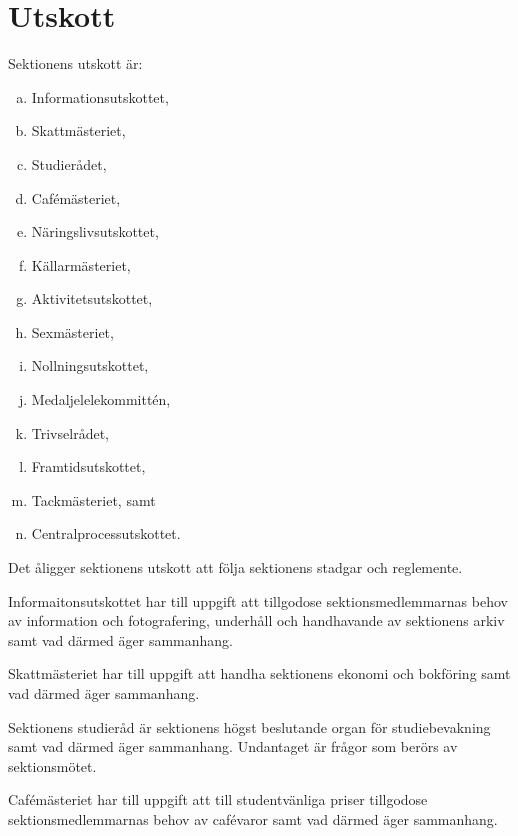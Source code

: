 \documentclass[stadgar]{dsekprotokoll}
\begin{document}
\section{Utskott}

\begin{stadgeavsnitt}


Sektionens utskott är:
\begin{enumerate}[a)]
\item Informationsutskottet,
\item Skattmästeriet,
\item Studierådet,
\item Cafémästeriet,
\item Näringslivsutskottet,
\item Källarmästeriet,
\item Aktivitetsutskottet,
\item Sexmästeriet,
\item Nollningsutskottet,
\item Medaljelelekommittén,
\item Trivselrådet,
\item Framtidsutskottet,
\item Tackmästeriet, samt
\item Centralprocessutskottet.
\end{enumerate}


Det åligger sektionens utskott att följa sektionens stadgar och
reglemente.


Informaitonsutskottet har till uppgift att tillgodose sektionsmedlemmarnas behov av information och fotografering, underhåll och handhavande av sektionens arkiv samt vad därmed äger sammanhang.


Skattmästeriet har till uppgift att handha sektionens ekonomi och bokföring
samt vad därmed äger sammanhang.


Sektionens studieråd är sektionens högst beslutande organ för studiebevakning samt vad
därmed äger sammanhang. Undantaget är frågor som berörs av sektionsmötet.


Cafémästeriet har till uppgift att till studentvänliga priser tillgodose
sektionsmedlemmarnas behov av cafévaror samt vad därmed äger sammanhang.


\end{stadgeavsnitt}
\end{document}
